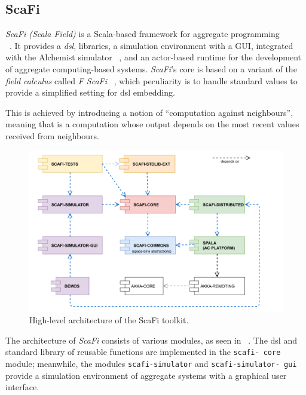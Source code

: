\subsection{ScaFi}
\label{subsec:scafi}


\emph{ScaFi (Scala Field)} is a Scala-based framework for aggregate programming\\ ~\cite{CASADEI2022101248}.
It provides a \emph{\ac{dsl}}, libraries, a simulation environment with a GUI, integrated with the
Alchemist simulator ~\cite{10.1007/978-3-030-78198-9_10}, and an actor-based runtime for the development of aggregate computing-based systems.
\emph{ScaFi}'s core is based on a variant of the \emph{field calculus} called \emph{F ScaFi} ~\cite{10.1007/978-3-030-61470-6_21},
which peculiarity is to handle standard values to provide a simplified setting for \ac{dsl} embedding.

This is achieved by introducing a notion of ``computation against neighbours'', meaning that is a computation whose
output depends on the most recent values received from neighbours.

\begin{figure}
    \centering
    \includegraphics[width=.7\linewidth]{figures/scafi_structure}
    \caption{High-level architecture of the ScaFi toolkit.}
    \label{fig:scafi-structure}
\end{figure}

The architecture of \emph{ScaFi} consists of various modules, as seen in ~.
The \ac{dsl} and standard library of reusable functions are implemented in the \texttt{scafi-
core} module; meanwhile, the modules \texttt{scafi-simulator} and \texttt{scafi-simulator-
gui} provide a simulation
environment of aggregate systems with a graphical user interface.

